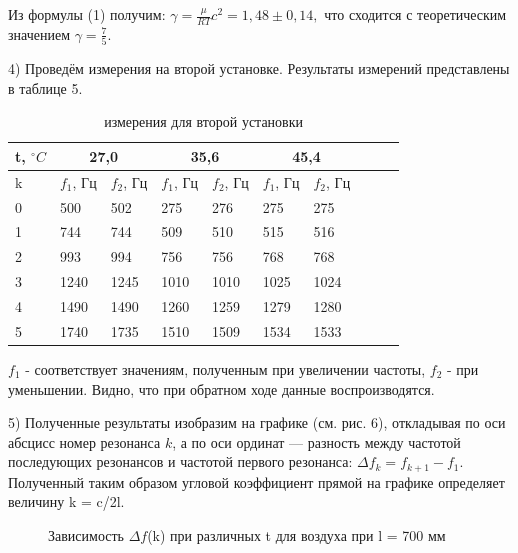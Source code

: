 \documentclass[a4paper,11pt]{extarticle} %
\begin{document}
		Из формулы (1) получим: $\gamma=\frac{\mu}{RT} c^2 = 1,48 \pm 0,14,$ что сходится с теоретическим значением $\gamma = \frac{7}{5}$.
		
		
		4) Проведём измерения на второй установке. Результаты измерений представлены в таблице 5.
		   
		    \begin{table}[ht!]
			\begin{center}
			\begin{tabular}{|l|l|l|l|l|l|l|l|l|l|}
			\hline
			t, $^\circ C$ & \multicolumn{2}{|c|}{27,0} & \multicolumn{2}{|c|}{35,6}&  \multicolumn{2}{|c|}{45,4}
			\\
			\hline
			k &  $f_1$, Гц & $f_2$, Гц & $f_1$, Гц & $f_2$, Гц & $f_1$, Гц & $f_2$, Гц
			\\
			\hline
			0 & 500 & 502 & 275 & 276 & 275 & 275 
			\\
			\hline
			1 & 744 & 744 & 509 & 510 & 515 & 516 
			\\
			\hline
			2 & 993 & 994 & 756 & 756 & 768 & 768 
			\\
			\hline
			3 & 1240 & 1245 & 1010 & 1010 & 1025 &  1024
			\\
			\hline
			4 & 1490 & 1490 & 1260 & 1259 & 1279 & 1280 
			\\
			\hline
			5 & 1740 & 1735 & 1510 & 1509 & 1534 & 1533 
			\\
			\hline
		\end{tabular}
		\caption{измерения для второй установки}
		\end{center}
		\end{table}
		
		$f_1$ - соответствует значениям, полученным при увеличении частоты, $f_2$ - при уменьшении. Видно, что при обратном ходе данные воспроизводятся.		


		5) Полученные результаты изобразим на графике (см. рис. 6), откладывая
		по оси абсцисс номер резонанса $k$, а по оси ординат — разность между частотой последующих резонансов и частотой первого резонанса: $\Delta f_k = f_{k+1}-f_1.$ Полученный таким образом угловой
		коэффициент прямой на графике определяет величину k = c/2l.
		
\begin{figure}[ht!]
    \caption{Зависимость $\Delta f$(k) при различных t для воздуха при l = 700 мм}
	\end{figure}
\end{document}

